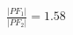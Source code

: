 \documentclass[preview]{standalone}
\begin{document}
\begin{align*}
\frac{|PF_1|}{|PF_2|} = 1.58
\end{align*}
\end{document}
